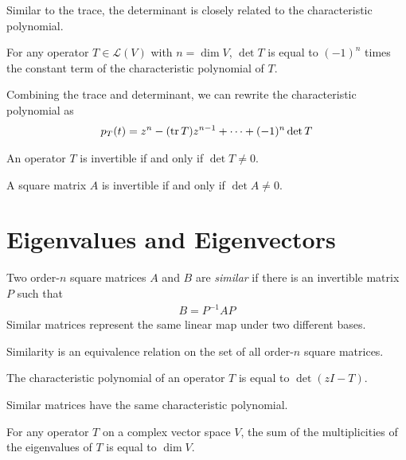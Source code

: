 \documentclass{article}
\begin{document}
Similar to the trace, the determinant is closely related to the characteristic polynomial.

\begin{theorem}
  For any operator $T \in \mathcal{L}(V)$ with $n = \dim V$, $\det T$ is equal to $(-1)^n$ times the constant term of the characteristic polynomial of $T$.
\end{theorem}

\begin{remark}
  Combining the trace and determinant, we can rewrite the characteristic polynomial as
  \begin{align}
    p_T(t) = z^n - (\tr T)z^{n - 1} + \cdots + (-1)^n \det T
  \end{align}
\end{remark}

\begin{theorem}
  An operator $T$ is invertible if and only if $\det T \neq 0$.
\end{theorem}

\begin{theorem}
  A square matrix $A$ is invertible if and only if $\det A \neq 0$.
\end{theorem}

\section{Eigenvalues and Eigenvectors}

\begin{definition}
  Two order-$n$ square matrices $A$ and $B$ are \emph{similar} if there is an invertible matrix $P$ such that
  \begin{align}
    B = P^{-1}AP
  \end{align}
  Similar matrices represent the same linear map under two different bases.
\end{definition}

\begin{remark}
  Similarity is an equivalence relation on the set of all order-$n$ square matrices.
\end{remark}

\begin{definition}
  The characteristic polynomial of an operator $T$ is equal to $\det (zI - T)$.
\end{definition}

\begin{remark}
  Similar matrices have the same characteristic polynomial.
\end{remark}

\begin{theorem}
  For any operator $T$ on a complex vector space $V$, the sum of the multiplicities of the eigenvalues of $T$ is equal to $\dim V$.
\end{theorem}
\end{document}
